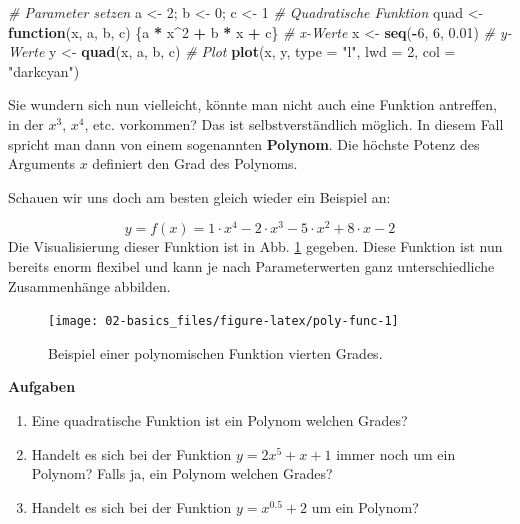 \documentclass[
]{book}
\newenvironment{Shaded}{\begin{snugshade}}{\end{snugshade}}
\newcommand{\AttributeTok}[1]{\textcolor[rgb]{0.13,0.29,0.53}{#1}}
\newcommand{\CommentTok}[1]{\textcolor[rgb]{0.56,0.35,0.01}{\textit{#1}}}
\newcommand{\ControlFlowTok}[1]{\textcolor[rgb]{0.13,0.29,0.53}{\textbf{#1}}}
\newcommand{\DecValTok}[1]{\textcolor[rgb]{0.00,0.00,0.81}{#1}}
\newcommand{\FloatTok}[1]{\textcolor[rgb]{0.00,0.00,0.81}{#1}}
\newcommand{\FunctionTok}[1]{\textcolor[rgb]{0.13,0.29,0.53}{\textbf{#1}}}
\newcommand{\NormalTok}[1]{#1}
\newcommand{\OtherTok}[1]{\textcolor[rgb]{0.56,0.35,0.01}{#1}}
\newcommand{\SpecialCharTok}[1]{\textcolor[rgb]{0.81,0.36,0.00}{\textbf{#1}}}
\newcommand{\StringTok}[1]{\textcolor[rgb]{0.31,0.60,0.02}{#1}}
\providecommand{\tightlist}{%
  \setlength{\itemsep}{0pt}\setlength{\parskip}{0pt}}
\begin{document}
\begin{Shaded}
\begin{Highlighting}[]
\CommentTok{\# Parameter setzen}
\NormalTok{a }\OtherTok{\textless{}{-}} \DecValTok{2}\NormalTok{; b }\OtherTok{\textless{}{-}} \DecValTok{0}\NormalTok{; c }\OtherTok{\textless{}{-}} \DecValTok{1}
\CommentTok{\# Quadratische Funktion}
\NormalTok{quad }\OtherTok{\textless{}{-}} \ControlFlowTok{function}\NormalTok{(x, a, b, c) \{a }\SpecialCharTok{*}\NormalTok{ x}\SpecialCharTok{\^{}}\DecValTok{2} \SpecialCharTok{+}\NormalTok{ b }\SpecialCharTok{*}\NormalTok{ x }\SpecialCharTok{+}\NormalTok{ c\}}
\CommentTok{\# x{-}Werte}
\NormalTok{x }\OtherTok{\textless{}{-}} \FunctionTok{seq}\NormalTok{(}\SpecialCharTok{{-}}\DecValTok{6}\NormalTok{, }\DecValTok{6}\NormalTok{, }\FloatTok{0.01}\NormalTok{)}
\CommentTok{\# y{-}Werte}
\NormalTok{y }\OtherTok{\textless{}{-}} \FunctionTok{quad}\NormalTok{(x, a, b, c)}
\CommentTok{\# Plot}
\FunctionTok{plot}\NormalTok{(x, y, }\AttributeTok{type =} \StringTok{"l"}\NormalTok{, }\AttributeTok{lwd =} \DecValTok{2}\NormalTok{, }\AttributeTok{col =} \StringTok{"darkcyan"}\NormalTok{)}
\end{Highlighting}
\end{Shaded}

Sie wundern sich nun vielleicht, könnte man nicht auch eine Funktion antreffen, in der \(x^3\), \(x^4\), etc. vorkommen? Das ist selbstverständlich möglich. In diesem Fall spricht man dann von einem sogenannten \textbf{Polynom}. Die höchste Potenz des Arguments \(x\) definiert den Grad des Polynoms.

Schauen wir uns doch am besten gleich wieder ein Beispiel an:

\[
y = f(x) = 1 \cdot x^4 - 2 \cdot x^3 - 5 \cdot x^2 + 8 \cdot x - 2
\]
Die Visualisierung dieser Funktion ist in Abb. \ref{fig:poly-func} gegeben. Diese Funktion ist nun bereits enorm flexibel und kann je nach Parameterwerten ganz unterschiedliche Zusammenhänge abbilden.

\begin{figure}

{\centering \texttt{[image: 02-basics\_files/figure-latex/poly-func-1]} 

}

\caption{Beispiel einer polynomischen Funktion vierten Grades.}\label{fig:poly-func}
\end{figure}

\textbf{Aufgaben}

\begin{enumerate}
\def\labelenumi{\arabic{enumi}.}
\tightlist
\item
  Eine quadratische Funktion ist ein Polynom welchen Grades?
\item
  Handelt es sich bei der Funktion \(y=2x^5 + x + 1\) immer noch um ein Polynom? Falls ja, ein Polynom welchen Grades?
\item
  Handelt es sich bei der Funktion \(y = x^{0.5} + 2\) um ein Polynom?
\end{enumerate}
\end{document}
